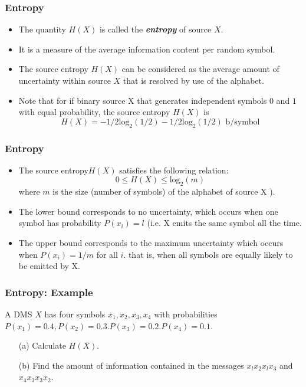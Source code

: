 \documentclass[a4]{beamer}
\begin{document}
\begin{frame}
\frametitle{Entropy}
\begin{itemize}
\item The quantity $H(X)$ is called the \emph{\textbf{entropy}} of source $X$. \item It is a measure of the average information content per random symbol.
\item The source entropy $H(X)$ can be considered as the average amount of uncertainty
within source $X$ that is resolved by use of the alphabet.

\item Note that for if  binary source X that generates independent symbols $0$ and $1$ with equal probability, the source entropy $H(X)$ is
\[ H(X ) = -1/2 \mbox{log}_2 (1/2) - 1/2 \mbox{log}_2 (1/2) \mbox{   b/symbol}  \]
\end{itemize}
\end{frame}


\begin{frame}
\frametitle{Entropy}
\begin{itemize}
\item The source entropy$ H(X)$ satisfies the following relation:
\[0 \leq H(X) \leq \mbox{log}_2(m) \]where $m$ is the size (number of symbols) of the alphabet of source X ).
\item  The lower bound corresponds to no uncertainty, which occurs when one symbol has probability $P(x_i) = l$ (i.e. X emits the same symbol all the time.
\item The upper bound corresponds to the maximum uncertainty which occurs when $P(x_i) = 1 /m$ for all $i$. that is, when all symbols are equally likely to be emitted by X.
 \end{itemize}
\end{frame}


\begin{frame}
\frametitle{Entropy: Example}
A DMS $X$ has four symbols $x_1 , x_2, x_3, x_4$ with probabilities $P(x_1) = 0.4, P(x_2) = 0.3. P(x_3) = 0.2.
P(x_4) = 0.1$.
\begin{itemize}
\item[(a)] Calculate $H(X)$.
\item[(b)] Find the amount of information contained in the messages $x_lx_2x_lx_3$ and $x_4x_3x_3x_2$.
\end{itemize}
\end{frame}
\end{document}
